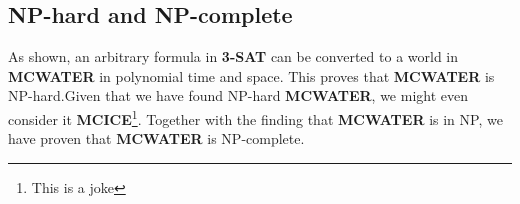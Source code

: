 \subsection{NP-hard and NP-complete}
As shown, an arbitrary formula in \textbf{3-SAT} can be converted to a world in \textbf{MCWATER} in polynomial time and space. This proves that \textbf{MCWATER} is NP-hard.\newline Given that we have found NP-hard \textbf{MCWATER}, we might even consider it \textbf{MCICE}\footnote{This is a joke}.
\linebreak
\noindent Together with the finding that \textbf{MCWATER} is in NP, we have proven that \textbf{MCWATER} is NP-complete.

